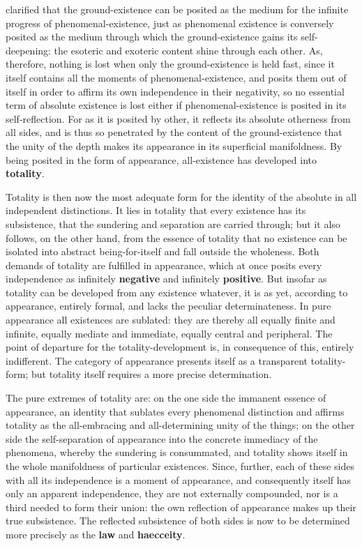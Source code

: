 \documentclass[12pt,a4paper,openany]{book}
\newcommand{\opage}[1]{\marginnote{\footnotesize\textit{[#1]}}}
\begin{document}
clarified that the ground-existence can be posited as the medium for
the infinite progress of phenomenal-existence, just as %
phenomenal existence is conversely posited as
the medium through which the ground-existence gains
its self-deepening: the esoteric and exoteric content
shine through each other. As, therefore, nothing
is lost when only the ground-existence is held fast, since
it itself contains all the moments of phenomenal-existence,
and posits them out of itself in order to affirm its own independence
in their negativity, so
no essential term of absolute existence is lost either
if phenomenal-existence is posited in its
self-reflection. For as it is posited by other, it reflects
its absolute otherness from all sides, and is thus
so penetrated by the content of the ground-existence that the unity of the depth
makes its appearance in its superficial
manifoldness. By being posited in the form of appearance,
all-existence has developed into \textbf{totality}.

Totality is then now the most adequate form for
the identity of the absolute in all independent distinctions.
It lies in totality that every existence has its
subsistence, that the sundering and separation are carried
through; but it also follows, on the other hand, from
the essence of totality that no existence can be isolated
into abstract being-for-itself and fall outside the wholeness.
Both demands of totality are fulfilled in appearance,
which at once posits every independence
as infinitely \textbf{negative} and infinitely \textbf{positive}.
\setcounter{footnote}{0}%
\opage{182}But insofar as totality can be developed from
any existence whatever, it is as yet, according to appearance,
entirely formal, and lacks the peculiar
determinateness. In pure appearance all existences are
sublated: they are thereby all equally finite and
infinite, equally mediate and immediate, equally
central and peripheral. The point of departure for the totality-development
is, in consequence of this, entirely indifferent.
The category of appearance presents itself as a
transparent totality-form; but totality itself
requires a more precise determination.

The pure extremes of totality are: on the one side
the immanent essence of appearance, an identity that
sublates every phenomenal distinction and affirms
totality as the all-embracing and all-determining unity of the things; on the other side the self-separation of appearance
into the concrete immediacy of the phenomena,
whereby the sundering is consummated, and totality
shows itself in the whole manifoldness of particular existences.
Since, further, each of these sides with
all its independence is a moment of appearance,
and consequently itself has only an apparent independence,
they are not externally compounded, nor is a third needed to form their union:
the own reflection of appearance makes up their
true subsistence. The reflected subsistence of both sides
is now to be determined more precisely as the \textbf{law} and \textbf{haecceity}.
\end{document}
